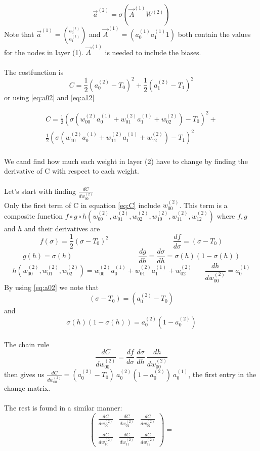 \documentclass{article}
\begin{document}
\[
\vec a^{(2)} = \sigma(\vec A^{(1)}W^{(2)})
\]
Note that $\vec a^{(1)} = \binom{a_0^{(1)}}{a_1^{(1)}}$ and $\vec A^{(1)} = (a_0^{(1)} a_1^{(1)} 1)$ both contain the values for the nodes in layer (1). $\vec A^{(1)}$ is needed to include the biases.
\\
\\ The costfunction is $$ C = \frac {1}{2}(a_0^{(2)}-T_0)^2 + \frac {1}{2}(a_1^{(2)}-T_1)^2 $$
or using \eqref{eq:a02} and \eqref{eq:a12}

\begin{equation} \label{eq:C} 
\begin{aligned}
C = \frac {1}{2}(\sigma(w_{00}^{(2)}a_0^{(1)}+w_{01}^{(2)}a_1^{(1)}+w_{02}^{(2)})-T_0)^2 + 
\\
\frac {1}{2}(\sigma(w_{10}^{(2)}a_0^{(1)}+w_{11}^{(2)}a_1^{(1)}+w_{12}^{(2)})-T_1)^2
\end{aligned}
\end{equation}
\\
We cand find how much each weight in layer (2) have to change by finding the derivative of C with respect to each weight.
\\
\\Let's start with finding $\frac{dC}{dw_{00}^{(2)}}$
\\
Only the first term of C in equation \eqref{eq:C} include $w_{00}^{(2)}$. This term is a composite function $f \circ g \circ h(w_{00}^{(2)}, w_{01}^{(2)}, w_{02}^{(2)}, w_{10}^{(2)}, w_{11}^{(2)},w_{12}^{(2)})$ where $f, g$ and $h$ and their derivatives are
$$f(\sigma) = \frac {1}{2}(\sigma-T_0)^2~~~~~~~~~~~~~~~~~~~~~~~~~~~~~~~~~~~~~~~~~\frac{df}{d\sigma} = (\sigma-T_0)$$
$$g(h) = \sigma(h)~~~~~~~~~~~~~~~~~~~~~~~~~~~~~~~~~~~~~~~~~~\frac{dg}{dh} = \frac{d\sigma}{dh} = \sigma(h)(1 - \sigma(h))$$ 
$$h(w_{00}^{(2)}, w_{01}^{(2)}, w_{02}^{(2)}) = w_{00}^{(2)}a_0^{(1)}+w_{01}^{(2)}a_1^{(1)}+w_{02}^{(2)}~~~~~~~~\frac{dh}{dw_{00}^{(2)}} = a_0^{(1)}$$
By using  \eqref{eq:a02} we note that $$(\sigma - T_0) = (a_0^{(2)} - T_0)$$ and $$\sigma(h)(1-\sigma(h)) =a_0^{(2)}(1-a_0^{(2)})$$ 
\\ The chain rule $$\frac{dC}{dw_{00}^{(2)}} = \frac{df}{d\sigma}~\frac{d\sigma}{dh}~\frac{dh}{dw_{00}^{(2)}}$$ 
then gives us
$\frac{dC}{dw_{00}^{(2)}} = (a_0^{(2)}-T_0)~a_0^{(2)}(1-a_0^{(2)})~a_0^{(1)} $, the first entry in the change matrix.
\\\\
The rest is found in a similar manner:
$$\begin{pmatrix}
\frac{dC}{dw_{00}^{(2)}} & \frac{dC}{dw_{01}^{(2)}} & \frac{dC}{dw_{02}^{(2)}}
\\\\
\frac{dC}{dw_{10}^{(2)}} & \frac{dC}{dw_{11}^{(2)}} & \frac{dC}{dw_{12}^{(2)}} 
\end{pmatrix} =
$$
\end{document}
